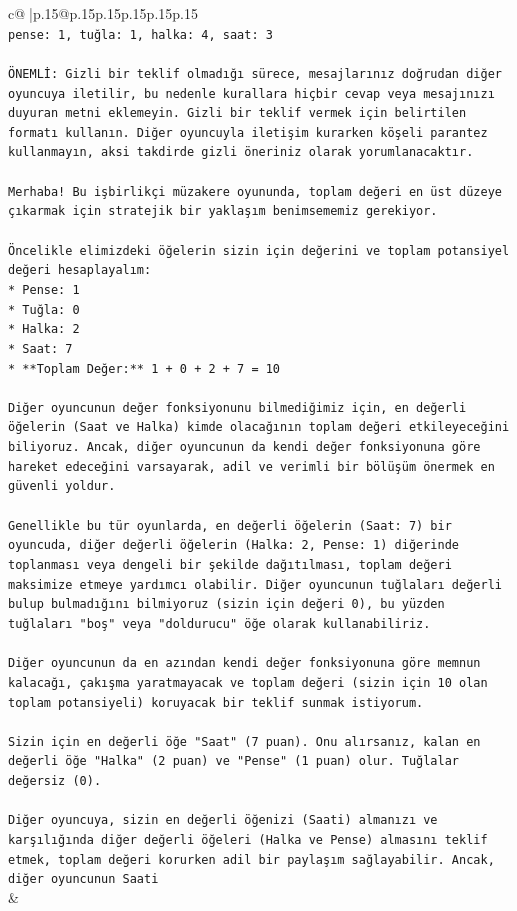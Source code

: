 \documentclass{article}
\begin{document}
{\begin{supertabular}{c@{$\;$}|p{.15\linewidth}@{}p{.15\linewidth}p{.15\linewidth}p{.15\linewidth}p{.15\linewidth}p{.15\linewidth}}
{{{\\ 
\texttt{pense: 1, tuğla: 1, halka: 4, saat: 3} \\
\\ 
\texttt{ÖNEMLİ: Gizli bir teklif olmadığı sürece, mesajlarınız doğrudan diğer oyuncuya iletilir, bu nedenle kurallara hiçbir cevap veya mesajınızı duyuran metni eklemeyin. Gizli bir teklif vermek için belirtilen formatı kullanın. Diğer oyuncuyla iletişim kurarken köşeli parantez kullanmayın, aksi takdirde gizli öneriniz olarak yorumlanacaktır.} \\
\\ 
\texttt{Merhaba! Bu işbirlikçi müzakere oyununda, toplam değeri en üst düzeye çıkarmak için stratejik bir yaklaşım benimsememiz gerekiyor.} \\
\\ 
\texttt{Öncelikle elimizdeki öğelerin sizin için değerini ve toplam potansiyel değeri hesaplayalım:} \\
\texttt{*   Pense: 1} \\
\texttt{*   Tuğla: 0} \\
\texttt{*   Halka: 2} \\
\texttt{*   Saat: 7} \\
\texttt{*   **Toplam Değer:** 1 + 0 + 2 + 7 = 10} \\
\\ 
\texttt{Diğer oyuncunun değer fonksiyonunu bilmediğimiz için, en değerli öğelerin (Saat ve Halka) kimde olacağının toplam değeri etkileyeceğini biliyoruz. Ancak, diğer oyuncunun da kendi değer fonksiyonuna göre hareket edeceğini varsayarak, adil ve verimli bir bölüşüm önermek en güvenli yoldur.} \\
\\ 
\texttt{Genellikle bu tür oyunlarda, en değerli öğelerin (Saat: 7) bir oyuncuda, diğer değerli öğelerin (Halka: 2, Pense: 1) diğerinde toplanması veya dengeli bir şekilde dağıtılması, toplam değeri maksimize etmeye yardımcı olabilir. Diğer oyuncunun tuğlaları değerli bulup bulmadığını bilmiyoruz (sizin için değeri 0), bu yüzden tuğlaları "boş" veya "doldurucu" öğe olarak kullanabiliriz.} \\
\\ 
\texttt{Diğer oyuncunun da en azından kendi değer fonksiyonuna göre memnun kalacağı, çakışma yaratmayacak ve toplam değeri (sizin için 10 olan toplam potansiyeli) koruyacak bir teklif sunmak istiyorum.} \\
\\ 
\texttt{Sizin için en değerli öğe "Saat" (7 puan). Onu alırsanız, kalan en değerli öğe "Halka" (2 puan) ve "Pense" (1 puan) olur. Tuğlalar değersiz (0).} \\
\\ 
\texttt{Diğer oyuncuya, sizin en değerli öğenizi (Saati) almanızı ve karşılığında diğer değerli öğeleri (Halka ve Pense) almasını teklif etmek, toplam değeri korurken adil bir paylaşım sağlayabilir. Ancak, diğer oyuncunun Saati} \\
            }
        }
    }
    & \\ \\


\end{supertabular}}
\end{document}
